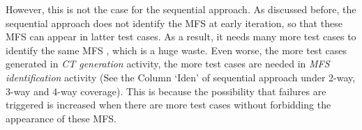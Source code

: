 \documentclass{sig-alternate}
\begin{document}
However, this is not the case for the sequential approach. As discussed before, the sequential approach does not identify the MFS at early iteration, so that these MFS can appear in latter test cases. As a result, it needs many more test cases to identify the same MFS , which is a huge waste. Even worse, the more test cases generated in \emph{CT generation} activity, the more test cases are needed in \emph{MFS identification} activity (See the Column `Iden' of sequential approach under 2-way, 3-way and 4-way coverage).  This is because the possibility that failures are triggered is increased when there are more test cases without forbidding the appearance of these MFS.


%
\end{document}
